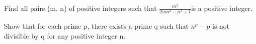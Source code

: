

\item Find all pairs (m, n) of positive integers such that $\frac{m^2}{2mn^2 - n^3 +1}$is a positive integer.\\

\item Show that for each prime p, there exists a prime q such that
$n^p - p$ is not divisible by q for any positive integer n.


